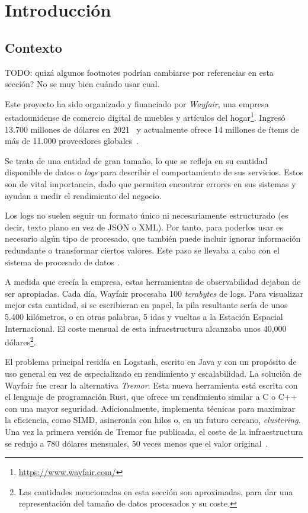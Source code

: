 
\chapter{Introducción}

\section{Contexto}

TODO: quizá algunos footnotes podrían cambiarse por referencias en esta sección?
No se muy bien cuándo usar cual.

Este proyecto ha sido organizado y financiado por \emph{Wayfair}, una empresa
estadounidense de comercio digital de muebles y artículos del
hogar\footnote{\url{https://www.wayfair.com/}}. Ingresó 13.700 millones de
dólares en 2021~\cite{wayfairRevenue} y actualmente ofrece 14 millones de ítems
de más de 11.000 proveedores globales~\cite{wayfairItems}.

Se trata de una entidad de gran tamaño, lo que se refleja en su cantidad
disponible de datos o \emph{logs} para describir el comportamiento de sus
servicios. Estos son de vital importancia, dado que permiten encontrar errores
en sus sistemas y ayudan a medir el rendimiento del negocio.

Los logs no suelen seguir un formato único ni necesariamente estructurado (es
decir, texto plano en vez de JSON o XML). Por tanto, para poderlos usar es
necesario algún tipo de procesado, que también puede incluir ignorar información
redundante o transformar ciertos valores. Este paso se llevaba a cabo con el
sistema de procesado de datos \textcite{logstash}.

A medida que crecía la empresa, estas herramientas de observabilidad dejaban de
ser apropiadas. Cada día, Wayfair procesaba 100 \emph{terabytes} de logs. Para
visualizar mejor esta cantidad, si se escribieran en papel, la pila resultante
sería de unos 5.400 kilómetros, o en otras palabras, 5 idas y vueltas a la
Estación Espacial Internacional. El coste mensual de esta infraestructura
alcanzaba unos 40,000 dólares\footnote{Las cantidades mencionadas en esta
sección son aproximadas, para dar una representación del tamaño de datos
procesados y su coste.}.

El problema principal residía en Logstash, escrito en Java y con un propósito de
uso general en vez de especializado en rendimiento y escalabilidad. La solución
de Wayfair fue crear la alternativa \emph{Tremor}. Esta nueva herramienta está
escrita con el lenguaje de programación Rust, que ofrece un rendimiento similar
a C o C++ con una mayor seguridad. Adicionalmente, implementa técnicas para
maximizar la eficiencia, como SIMD, asincronía con hilos o, en un futuro
cercano, \emph{clustering}. Una vez la primera versión de Tremor fue publicada,
el coste de la infraestructura se redujo a 780 dólares mensuales, 50 veces menos
que el valor original~\cite{tremorcon_lll}.

